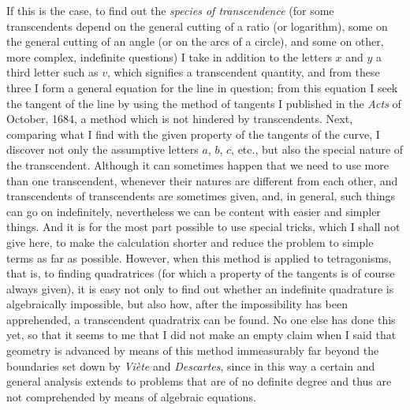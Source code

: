 \documentclass[twoside,openright]{article}
\begin{document}
If this is the case, to find out the {\em species of transcendence}
(for some transcendents depend on the general cutting of a ratio (or
logarithm), some on the general cutting of an angle (or on the arcs of
a circle), and some on other, more complex, indefinite questions) I
take in addition to the letters $x$ and $y$ a third letter such as
$v$, which signifies a transcendent quantity, and from these three I
form a general equation for the line in question; from this equation I seek the tangent of the
line by using the method of tangents I published in the {\em Acts} of
October, 1684, a method which is not hindered by transcendents.  Next,
comparing what I find with the given property of the tangents of the
curve, I discover not only the assumptive letters $a$, $b$, $c$, etc.,
but also the special nature of the transcendent.  Although it can
sometimes happen that we need to use more than one transcendent,
whenever their natures are different from each other, and
transcendents of transcendents are sometimes given, and, in general,
such things can go on indefinitely, nevertheless we can be content
with easier and simpler things.  And it is for the most part possible
to use special tricks, which I shall not give here, to make the
calculation shorter and reduce the problem to simple terms as far as
possible.  However, when this method is applied to tetragonisms, that
is, to finding quadratrices (for which a property of the tangents is
of course always given), it is easy not only to find out whether an
indefinite quadrature is algebraically impossible, but also how, after
the impossibility has been apprehended, a transcendent quadratrix can
be found.  No one else has done this yet, so that it seems to me that
I did not make an empty claim when I said that geometry is advanced by
means of this method immeasurably far beyond the boundaries set down
by {\em Vi\`{e}te} and {\em Descartes}, since in this way a certain
and general analysis extends to problems that are of no definite
degree and thus are not comprehended by means of algebraic equations.
\end{document}

